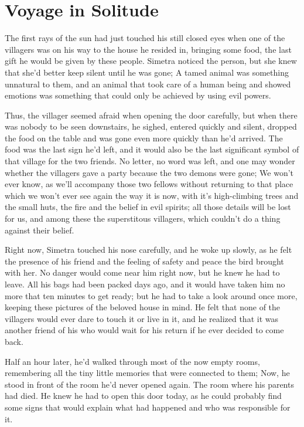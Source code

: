 \chapter{Voyage in Solitude}
\label{cha:voyage-solitude}
The first rays of the sun had just touched his still closed eyes when one of the villagers was on his way to the house he resided in, bringing some food, the last gift he would be given by these people. Simetra noticed the person, but she knew that she'd better keep silent until he was gone; A tamed animal was something unnatural to them, and an animal that took care of a human being and showed emotions was something that could only be achieved by using evil powers.

Thus, the villager seemed afraid when opening the door carefully, but when there was nobody to be seen downstairs, he sighed, entered quickly and silent, dropped the food on the table and was gone even more quickly than he'd arrived.
The food was the last sign he'd left, and it would also be the last significant symbol of that village for the two friends. No letter, no word was left, and one may wonder whether the villagers gave a party because the two demons were gone; We won't ever know, as we'll accompany those two fellows without returning to that place which we won't ever see again the way it is now, with it's high-climbing trees and the small huts, the fire and the belief in evil spirits; all those details will be lost for us, and among these the superstitous villagers, which couldn't do a thing against their belief.

Right now, Simetra touched his nose carefully, and he woke up slowly, as he felt the presence of his friend and the feeling of safety and peace the bird brought with her. No danger would come near him right now, but he knew he had to leave. All his bags had been packed days ago, and it would have taken him no more that ten minutes to get ready; but he had to take a look around once more, keeping these pictures of the beloved house in mind. He felt that none of the villagers would ever dare to touch it or live in it, and he realized that it was another friend of his who would wait for his return if he ever decided to come back.

Half an hour later, he'd walked through most of the now empty rooms, remembering all the tiny little memories that were connected to them; Now, he stood in front of the room he'd never opened again.
The room where his parents had died. He knew he had to open this door today, as he could probably find some signs that would explain what had happened and who was responsible for it.

